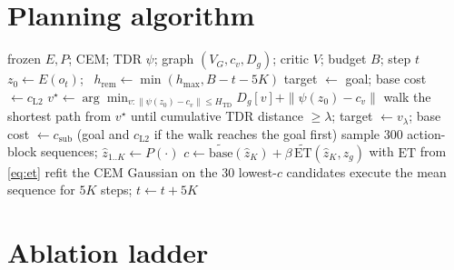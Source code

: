 \documentclass{article} %
\newcommand{\z}{z}
\newcommand{\psiT}{\psi}
\newcommand{\Htd}{H_{\mathrm{TD}}}
\newcommand{\ET}{\mathrm{ET}}
\begin{document}




\clearpage
\appendix
\section{Planning algorithm}
\label{app:algorithm}
\begin{algorithm}[h]
\caption{One planning call of graph-assisted latent MPC}
\label{alg:main}
\begin{algorithmic}[1]
\REQUIRE frozen $E,P$; CEM; TDR $\psiT$; graph $(V_G,c_v,D_g)$; critic $V$; budget $B$; step $t$
\STATE $\z_0\gets E(o_t)$; \ $h_{\mathrm{rem}}\gets\min(h_{\max},B-t-5K)$
\IF{$\|\psiT(\z_0)-\psiT(\z_g)\|\le\lambda$} \STATE target $\gets$ goal; base cost $\gets c_{\mathrm{L2}}$
\ELSE \STATE $v^\star\gets\arg\min_{v:\|\psiT(\z_0)-c_v\|\le\Htd} D_g[v]+\|\psiT(\z_0)-c_v\|$
\STATE walk the shortest path from $v^\star$ until cumulative TDR distance $\ge\lambda$; target $\gets v_\lambda$; base cost $\gets c_{\mathrm{sub}}$ (goal and $c_{\mathrm{L2}}$ if the walk reaches the goal first)
\ENDIF
{}
  \STATE sample 300 action-block sequences; $\hat\z_{1..K}\gets P(\cdot)$
  \STATE $c\gets\widetilde{\text{base}}(\hat\z_K)+\beta\,\widetilde{\ET}(\hat\z_K,\z_g)$ with $\ET$ from \cref{eq:et}
  \STATE refit the CEM Gaussian on the 30 lowest-$c$ candidates
\ENDFOR
\STATE execute the mean sequence for $5K$ steps; $t\gets t+5K$
\end{algorithmic}
\end{algorithm}

\section{Ablation ladder}
\label{app:ablation}
\end{document}
